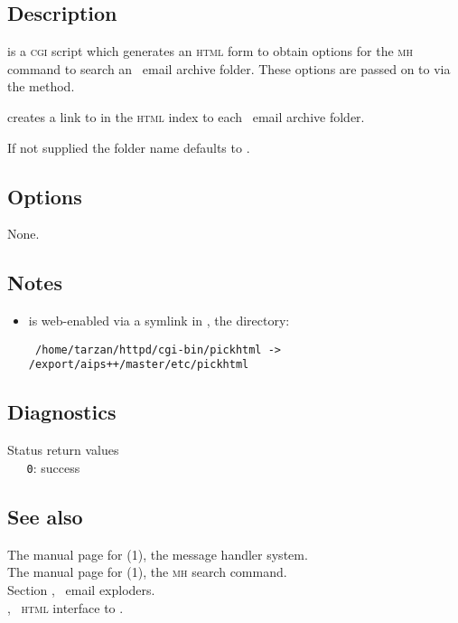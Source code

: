 \subsection*{Description}

 is a \textsc{cgi} script which generates an \textsc{html} form
to obtain options for the \textsc{mh}  command to search an
\aipspp\ email archive folder.  These options are passed on to
 via the  method.

 creates a link to  in the \textsc{html} index
to each \aipspp\ email archive folder.

If not supplied the folder name defaults to .

\subsection*{Options}

None.

\subsection*{Notes}

\begin{itemize}
\item
    is web-enabled via a symlink in
   , the  
   directory:

\begin{verbatim}
 /home/tarzan/httpd/cgi-bin/pickhtml -> /export/aips++/master/etc/pickhtml
\end{verbatim}
\end{itemize}

\subsection*{Diagnostics}

Status return values
\\ \verb+   0+: success

\subsection*{See also}

The manual page for (1), the message handler system.\\
The manual page for (1), the \textsc{mh} search command.\\
Section , \aipspp\ email exploders.\\
, \aipspp\ \textsc{html} interface to .

